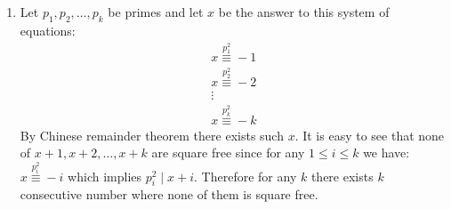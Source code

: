 \begin{enumerate}[label=]
    \item 
        Let $p_1, p_2, \dots, p_k$ be primes and let $x$ be the answer to this system of equations:
        \begin{gather*}
            x \overset{p_1^2}{\equiv} -1 \\
            x \overset{p_2^2}{\equiv} -2 \\
            \vdots \\
            x \overset{p_k^2}{\equiv} -k
        \end{gather*}
        By Chinese remainder theorem there exists such $x$. It is easy to see that none of $x + 1, x + 2, \dots, x + k$ are square free since for any $1 \le i \le k$ we have:
        $x \overset{p_i^2 }{\equiv } -i $ which implies $p_i^2 \mid x + i$. Therefore for any $k$ there exists $k$ consecutive number where none of them is square free.
\end{enumerate}